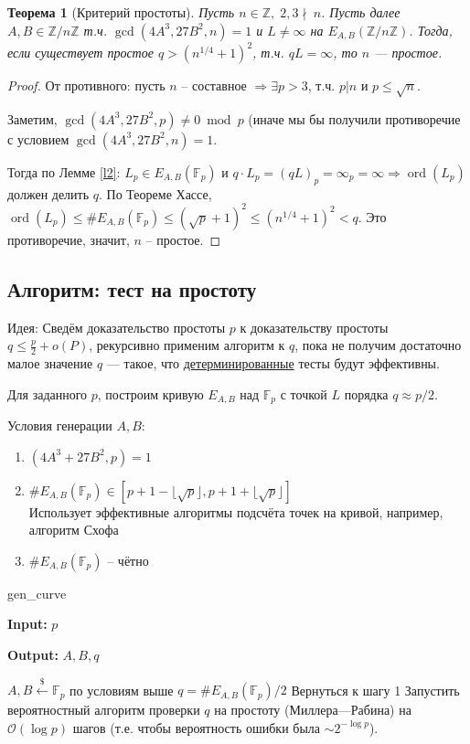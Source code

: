 \documentclass[12pt]{article}
\newcommand{\Z}{{{\mathbb Z}}}
\newcommand{\F}{{{\mathbb F}}}
\newcommand{\bigO}{\mathcal{O}}
\newtheorem{theorem}{Теорема}
\theoremstyle{definition}
\theoremstyle{definition}
\theoremstyle{definition}
\begin{document}
\begin{theorem}[Критерий простоты]
\label{t3}
    Пусть $n \in \Z,\; 2,3 \nmid \ n$. Пусть далее $A, B \in \Z/n\Z$ т.ч. $\gcd(4A^3, 27B^2, n) =1$ и $L \neq \infty$ на $E_{A,B}(\Z/n\Z)$. Тогда, если существует простое $q > (n^{1/4} + 1)^2$, т.ч. $qL = \infty$, то $n$ — простое. 
\end{theorem}
\begin{proof}
    От противного: пусть $n$ -- составное $\Rightarrow \exists p > 3$, т.ч. $p | n$ и $p \leq \sqrt{n}$.
    
    Заметим, $\gcd(4A^3, 27B^2, p) \neq 0 \bmod p$ (иначе мы бы получили противоречие с условием $\gcd(4A^3, 27B^2, n) = 1$.
    
    Тогда по Лемме \ref{l2}: $L_p \in E_{A,B}(\F_p)$ и $q\cdot L_p = (qL)_p = \infty_p = \infty \Rightarrow \operatorname{ord}(L_p)$ должен делить $q$.
    По Теореме Хассе, $\operatorname{ord}(L_p) \leq \#E_{A,B}(\F_p) \leq (\sqrt{p} + 1)^2 \leq (n^{1/4} + 1)^2 < q$. 
    Это противоречие, значит, $n$ -- простое.
\end{proof}

\subsection{Алгоритм: тест на простоту}

Идея: Сведём доказательство простоты $p$ к доказательству простоты $q \leq \frac{p}{2} + o(P)$, рекурсивно применим алгоритм к $q$, пока не получим достаточно малое значение $q$ — такое, что \underline{детерминированные} тесты будут эффективны.

Для заданного $p$, построим кривую $E_{A,B}$ над $\mathbb{F}_p$ с точкой $L$ порядка $q \approx p/2$.

Условия генерации $A, B$:
\begin{enumerate}[label=\alph*)]
    \item $(4A^3 + 27B^2, p) = 1$
    \item $\#E_{A,B}(\F_p) \in \left[ p+1 - \lfloor\sqrt{p}\rfloor, p + 1 + \lfloor\sqrt{p}\rfloor \right]$\\
    Использует эффективные алгоритмы подсчёта точек на кривой, например, алгоритм Схофа
    \item $\#E_{A,B}(\F_p)$ -- чётно
\end{enumerate}

\begin{algorithm}[H]
	\caption{gen\_curve}
	\label{alg:GenCurveP}
    \textbf{Input:} $p$
    
    \textbf{Output:} $A,B,q$

	\begin{algorithmic}[1]
		
		\State $A, B \xleftarrow{\$} \F_p$ по условиям выше
		\State $q = \#E_{A,B}(\F_p) / 2$
		    \State Вернуться к шагу 1  
	    \EndIf
	    \State Запустить вероятностный алгоритм проверки $q$ на простоту (Миллера—Рабина) на $\bigO(\log p)$ шагов (т.е. чтобы вероятность ошибки была $\sim 2^{-\log p}$).
	\end{algorithmic}
\end{algorithm}
\end{document}
